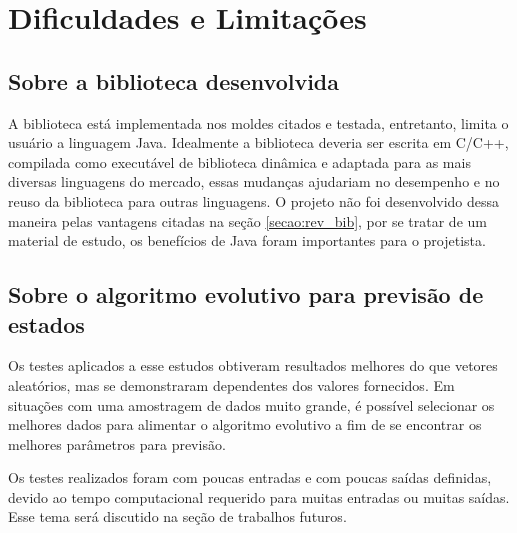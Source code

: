 \section{Dificuldades e Limitações}

\subsection{Sobre a biblioteca desenvolvida}

A biblioteca está implementada nos moldes citados e testada, entretanto, limita o usuário a linguagem Java. Idealmente a biblioteca deveria ser escrita em C/C++, compilada como executável de biblioteca dinâmica e adaptada para as mais diversas linguagens do mercado, essas mudanças ajudariam no desempenho e no reuso da biblioteca para outras linguagens. O projeto não foi desenvolvido dessa maneira pelas vantagens citadas na seção \ref{secao:rev_bib}, por se tratar de um material de estudo, os benefícios de Java foram importantes para o projetista.

\subsection{Sobre o algoritmo evolutivo para previsão de estados}

Os testes aplicados a esse estudos obtiveram resultados melhores do que vetores aleatórios, mas se demonstraram dependentes dos valores fornecidos. Em situações com uma amostragem de dados muito grande, é possível selecionar os melhores dados para alimentar o algoritmo evolutivo a fim de se encontrar os melhores parâmetros para previsão.

Os testes realizados foram com poucas entradas e com poucas saídas definidas, devido ao tempo computacional requerido para muitas entradas ou muitas saídas. Esse tema será discutido na seção de trabalhos futuros.
